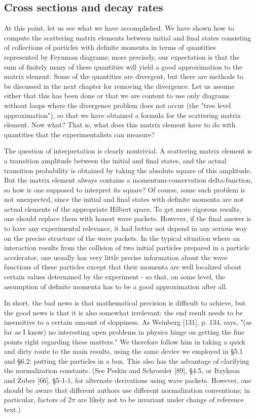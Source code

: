 \documentclass[10pt, letterpaper]{article}
\begin{document}
\subsection*{Cross sections and decay rates}
At this point, let us see what we have accomplished. We have shown how to compute the scattering matrix elements between initial and final states consisting of collections of particles with definite momenta in terms of quantities represented by Feynman diagrams; more precisely, our expectation is that the sum of finitely many of these quantities will yield a good approximation to the matrix element. Some of the quantities are divergent, but there are methods to be discussed in the next chapter for removing the divergence. Let us assume either that this has been done or that we are content to use only diagrams without loops where the divergence problem does not occur (the "tree level approximation"), so that we have obtained a formula for the scattering matrix element. Now what? That is, what does this matrix element have to do with quantities that the experimentalists can measure?

The question of interpretation is clearly nontrivial. A scattering matrix element is a transition amplitude between the initial and final states, and the actual transition probability is obtained by taking the absolute square of this amplitude. But the matrix element always contains a momentum-conservation delta-function, so how is one supposed to interpret its square? Of course, some such problem is not unexpected, since the initial and final states with definite momenta are not actual elements of the appropriate Hilbert space. To get more rigorous results, one should replace them with honest wave packets. However, if the final answer is to have any experimental relevance, it had better not depend in any serious way on the precise structure of the wave packets. In the typical situation where an interaction results from the collision of two initial particles prepared in a particle accelerator, one usually has very little precise information about the wave functions of these particles except that their momenta are well localized about certain values determined by the experiment - so that, on some level, the assumption of definite momenta has to be a good approximation after all.

In short, the bad news is that mathematical precision is difficult to achieve, but the good news is that it is also somewhat irrelevant: the end result needs to be insensitive to a certain amount of sloppiness. As Weinberg [131], p. 134, says, "(as far as I know) no interesting open problems in physics hinge on getting the fine points right regarding these matters." We therefore follow him in taking a quick and dirty route to the main results, using the same device we employed in §5.1 and §6.2: putting the particles in a box. This also has the advantage of clarifying the normalization constants. (See Peskin and Schroeder [89], §4.5, or Itzykson and Zuber [66], §5-1-1, for alternate derivations using wave packets. However, one should be aware that different authors use different normalization conventions; in particular, factors of $2 \pi$ are likely not to be invariant under change of reference text.)
\end{document}
